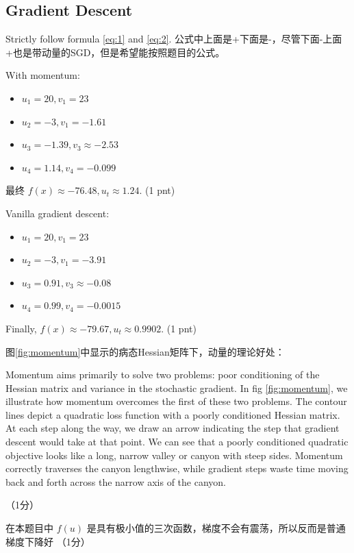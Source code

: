 \documentclass[12pt]{article}
\providecommand{\tightlist}{%
	\setlength{\itemsep}{0pt}\setlength{\parskip}{0pt}}
\begin{document}
\subsection{Gradient Descent}

Strictly follow formula \ref{eq:1} and \ref{eq:2}. 公式中上面是+下面是-，尽管下面-上面+也是带动量的SGD，但是希望能按照题目的公式。

With momentum:

\begin{itemize}
	\tightlist
	\item $u_1=20, v_1=23$
	\item $u_2=-3, v_1=-1.61$
	\item $u_3=-1.39, v_3\approx -2.53$
	\item $u_4=1.14,v_4=-0.099$
\end{itemize}

最终 $f(x) \approx -76.48, u_t \approx 1.24$.  (1 pnt)

Vanilla gradient descent:

\begin{itemize}
	\tightlist
	\item $u_1=20, v_1=23$
	\item $u_2=-3, v_1=-3.91$
	\item $u_3=0.91, v_3\approx -0.08$
	\item $u_4=0.99,v_4=-0.0015$
\end{itemize}

Finally, $f(x) \approx -79.67, u_t \approx 0.9902$. (1 pnt)

图\ref{fig:momentum}中显示的病态Hessian矩阵下，动量的理论好处：

Momentum aims primarily to solve two problems: poor conditioning of the Hessian matrix and variance in the stochastic gradient. In fig \ref{fig:momentum}, we illustrate how momentum overcomes the first of these two problems. The contour lines depict a quadratic loss function with a poorly conditioned Hessian matrix.  At each step along the way, we draw an arrow indicating the step that gradient descent would take at that point. We can see that a poorly conditioned quadratic objective looks like a long, narrow valley or canyon with steep sides. Momentum correctly traverses the canyon lengthwise, while gradient steps waste time moving back and forth across the narrow axis of the canyon.

（1分）

在本题目中 $f(u)$ 是具有极小值的三次函数，梯度不会有震荡，所以反而是普通梯度下降好 （1分）
\end{document}
